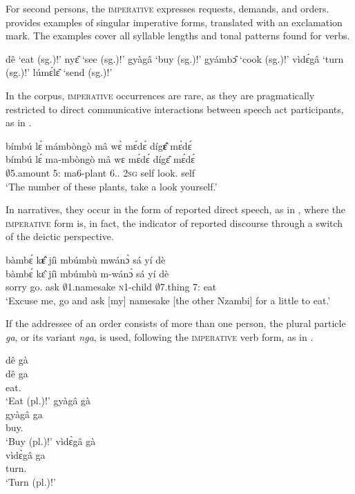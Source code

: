 For second persons, the \textsc{imperative} expresses requests, demands, and orders. 
  provides examples of singular imperative forms, translated with an exclamation mark. The examples cover all syllable lengths and tonal patterns found for verbs.

\ea\label{IMPSG}
\ea  dê `eat (sg.)!'
\ex nyɛ̂ `see (sg.)!'
\ex gyàgâ `buy (sg.)!'
\ex gyámbɔ̂ `cook (sg.)!' 
\ex vìdɛ́gâ `turn (sg.)!' 
\ex lúmɛ́lɛ̂  `send (sg.)!' 
\z
\z

In the corpus, \textsc{imperative} occurrences are rare, as they are pragmatically restricted to direct communicative interactions between speech act participants, as in .


\ea\label{impconv}
  \glll bímbú lɛ́ mámbòngò mâ wɛ̀ mɛ́dɛ́ díg{\bfseries ɛ̂} mɛ́dɛ́\\
         bímbú lɛ́ ma-mbòngò mâ wɛ mɛ́dɛ́ dígɛ̂ mɛ́dɛ́ \\
       $\emptyset$5.amount 5:{\ATT} ma6-plant 6.{\DEM}.{\PROX} 2\textsc{sg} self look.{\IMP} self\\
    \trans `The number of these plants, take a look yourself.'
\z


\noindent In narratives, they occur in the form of reported direct speech, as in , where the \textsc{imperative} form is, in fact, the indicator of reported discourse through a switch of the deictic perspective.

\ea\label{impdrd}
  \glll  bàmbɛ́ k{\bfseries ɛ̂} jíì mbúmbù mwánɔ̀ sá yí dè  \\
        bàmbɛ́ kɛ̂ jíì mbúmbù m-wánɔ̀ sá yí dè \\
           sorry  go.{\IMP} ask $\emptyset$1.namesake \textsc{n}1-child $\emptyset$7.thing 7:{\ATT} eat\\
    \trans `Excuse me, go and ask [my] namesake [the other Nzambi] for a little to eat.'
\z



 

If the addressee of an order consists of more than one person, the plural particle {\itshape ga}, or its variant {\itshape nga}, is used, following the \textsc{imperative} verb form, as in .

\ea\label{IMPPL}
\ea
  \glll dê gà \\
         dê ga\\
         eat.{\IMP} {\PL}\\
    \trans `Eat (pl.)!' 
\ex 
  \glll gyàgâ gà \\
         gyàgâ ga\\
         buy.{\IMP} {\PL}\\
    \trans `Buy (pl.)!' 
\ex 
  \glll vìdɛ̀gâ gà \\
         vìdɛ̀gâ ga\\
         turn.{\IMP} {\PL}\\
    \trans `Turn (pl.)!'
\z
\z



